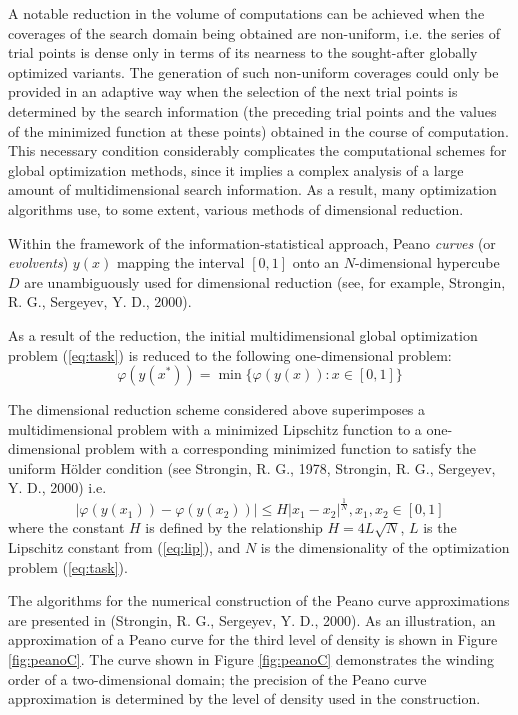 \documentclass{gOMS2e}
\theoremstyle{plain}%
\theoremstyle{definition}
\theoremstyle{remark}
\begin{document}
A notable reduction in the volume of computations can be achieved when the coverages of the
search domain being obtained are non-uniform, i.e. the series of trial points is dense
only in terms of its nearness to the sought-after globally optimized variants.
The generation of such non-uniform coverages could only be provided in an adaptive
way when the selection of the next trial points is determined by the search information
(the preceding trial points and the values of the minimized function at these points)
obtained in the course of computation. This necessary condition considerably
complicates the computational schemes for global optimization methods, since it
implies a complex analysis of a large amount of multidimensional search information.
As a result, many optimization algorithms use, to some extent, various methods of dimensional reduction.
\par
Within the framework of the information-statistical approach, Peano \textit{curves} (or \textit{evolvents})
\(y(x)\) mapping the interval \([0, 1]\) onto an \(N\)-dimensional hypercube \(D\) are
unambiguously used for dimensional reduction (see, for example, Strongin, R. G., Sergeyev, Y. D., 2000).
\par
As a result of the reduction, the initial multidimensional global optimization
problem (\ref{eq:task}) is reduced to the following one-dimensional problem:
\begin{equation}
\label{eq:oneDimTask}
\varphi(y(x^*))=\min\{\varphi(y(x)):x\in [0,1]\}
\end{equation}
\par
The dimensional reduction scheme considered above superimposes a multidimensional
problem with a minimized Lipschitz function to a one-dimensional problem with a
corresponding minimized function to satisfy the uniform Hölder condition (see Strongin, R. G., 1978, Strongin, R. G., Sergeyev, Y. D., 2000) i.e.
\begin{equation}
\label{eq:holder}
|\varphi(y(x_1))-\varphi(y(x_2))|\leqslant H{|x_1-x_2|}^{\frac{1}{N}},x_1,x_2\in[0,1]
\end{equation}
where the constant \(H\) is defined by the relationship \(H=4L\sqrt{N}\), \(L\) is the
Lipschitz constant from (\ref{eq:lip}), and \(N\) is the dimensionality of the optimization problem (\ref{eq:task}).
\par
The algorithms for the numerical construction of the Peano curve approximations are presented in (Strongin, R. G., Sergeyev, Y. D., 2000).
As an illustration, an approximation of a Peano curve for the third level of density is
shown in Figure \ref{fig:peanoC}. The curve shown in Figure \ref{fig:peanoC} demonstrates the winding order of a
two-dimensional domain; the precision of the Peano curve approximation is determined by the
level of density used in the construction.
\end{document}
